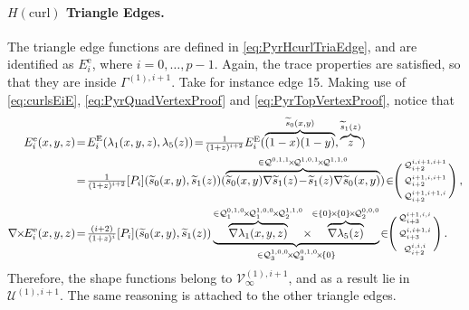 \paragraph{\texorpdfstring{$H(\mathrm{curl})$}{Hcurl} Triangle Edges.}
The triangle edge functions are defined in \eqref{eq:PyrHcurlTriaEdge}, and are identified as $E_i^\mathrm{e}$, where $i=0,\ldots,p-1$.
Again, the trace properties are satisfied, so that they are inside $\Gamma^{(1),i+1}$.
Take for instance edge 15.
Making use of \eqref{eq:curlsEiE}, \eqref{eq:PyrQuadVertexProof} and \eqref{eq:PyrTopVertexProof}, notice that
\begin{equation}
\begin{aligned}
	E_i^\mathrm{e}(x,y,z)&\!=\!E_i^\E(\lambda_1(x,y,z),\lambda_5(z))
			\!=\!\textstyle{\frac{1}{(1+z)^{i+2}}}E_i^\E(\overbrace{(1-x)(1-y)}^{\tilde{s}_0(x,y)},\overbrace{z}^{\tilde{s}_1(z)})\\
	&\!=\!\textstyle{\frac{1}{(1+z)^{i+2}}}[P_i](\tilde{s}_0(x,y),\tilde{s}_1(z))
			(\overbrace{\tilde{s}_0(x,y)\nabla\tilde{s}_1(z)\!-\!\tilde{s}_1(z)\nabla\tilde{s}_0(x,y)}^{
				\in\mathcal{Q}^{0,1,1}\!\times\!\mathcal{Q}^{1,0,1}\!\times\!\mathcal{Q}^{1,1,0}})
						\!\in\!\!\Bigg(\begin{smallmatrix}\mathcal{Q}_{i+2}^{i,i+1,i+1}\\[2pt]\mathcal{Q}_{i+2}^{i+1,i,i+1}\\[2pt]	
							\mathcal{Q}_{i+2}^{i+1,i+1,i}\end{smallmatrix}\Bigg)\,,\\
	\nabla\!\!\times\!\! E_i^\mathrm{e}(x,y,z)&\!=\!
		\textstyle{\frac{(i+2)}{(1+z)^{i}}}
			[P_i](\tilde{s}_0(x,y),\tilde{s}_1(z))\underbrace{\overbrace{\nabla\lambda_1(x,y,z)}^{
				\in\mathcal{Q}_1^{0,1,0}\!\times\!\mathcal{Q}_1^{1,0,0}\!\times\!\mathcal{Q}_2^{1,1,0}}
					\!\times\!\overbrace{\nabla\lambda_5(z)}^{
					\in\{0\}\!\times\!\{0\}\!\times\!\mathcal{Q}_2^{0,0,0}}}_{
						\in\mathcal{Q}_3^{1,0,0}\!\times\!\mathcal{Q}_3^{0,1,0}\!\times\!\{0\}}
							\!\in\!\!\Bigg(\begin{smallmatrix}\mathcal{Q}_{i+3}^{i+1,i,i}\\[2pt]\mathcal{Q}_{i+3}^{i,i+1,i}\\[2pt]	
								\mathcal{Q}_{i+2}^{i,i,i}\end{smallmatrix}\Bigg)\,.
\end{aligned}
\end{equation}
Therefore, the shape functions belong to $\mathcal{V}_\infty^{(1),i+1}$, and as a result lie in $\mathcal{U}^{(1),i+1}$.
The same reasoning is attached to the other triangle edges.

